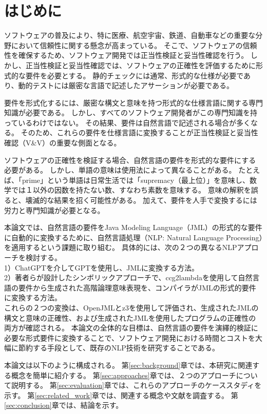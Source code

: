 \documentclass[uplatex, twocolumn,10pt]{jsarticle} %
\begin{document}
\section{はじめに} %
ソフトウェアの普及により、特に医療、航空宇宙、鉄道、自動車などの重要な分野において信頼性に関する懸念が高まっている。
そこで、ソフトウェアの信頼性を確保するため、ソフトウェア開発では正当性検証と妥当性確認を行う。
しかし、正当性検証と妥当性確認では、ソフトウェアの正確性を評価するために形式的な要件を必要とする。
静的チェックには通常、形式的な仕様が必要であり、動的テストには厳密な言語で記述したアサーションが必要である。

要件を形式化するには、厳密な構文と意味を持つ形式的な仕様言語に関する専門知識が必要である。
しかし、すべてのソフトウェア開発者がこの専門知識を持っているわけではない。
その結果、要件は自然言語で記述される場合が多くなる。
そのため、これらの要件を仕様言語に変換することが正当性検証と妥当性確認（V\&V）の重要な側面となる。

ソフトウェアの正確性を検証する場合、自然言語の要件を形式的な要件にする必要がある。
しかし、単語の意味は使用法によって異なることがある。
たとえば、「prime」という単語は日常生活では「supremacy（最上位）」を意味し、数学では１以外の因数を持たない数、すなわち素数を意味する。
意味の解釈を誤ると、壊滅的な結果を招く可能性がある。
加えて、要件を人手で変換するには労力と専門知識が必要となる。

本論文では、自然言語の要件をJava Modeling Language（JML）\cite{1}の形式的な要件に自動的に変換するために、自然言語処理（NLP: Natural Language Processing）を適用するという課題に取り組む。
具体的には、次の２つの異なるNLPアプローチを検討する。\\
1）ChatGPTを介してGPT\cite{2}を使用し、JMLに変換する方法。\\
2）著者らが設計したシンボリックアプローチで、ccg2lambda\cite{3}を使用して自然言語の要件から生成された高階論理意味表現を、コンパイラがJMLの形式的要件に変換する方法。\\
これらの２つの変換は、OpenJML\cite{4}とz3\cite{5}を使用して評価され、生成されたJMLの構文と意味の正確性、および生成されたJMLを使用したプログラムの正確性の両方が確認される。
本論文の全体的な目標は、自然言語の要件を演繹的検証に必要な形式要件に変換することで、ソフトウェア開発における時間とコストを大幅に節約する手段として、既存のNLP技術を研究することである。

本論文は以下のように構成される。
第\ref{sec:background}章では、本研究に関連する概念を簡単に紹介する。
第\ref{sec:approaches}章では、２つのアプローチについて説明する。
第\ref{sec:evaluation}章では、これらのアプローチのケーススタディを示す。
第\ref{sec:related_work}章では、関連する概念や文献を調査する。
第\ref{sec:conclusion}章では、結論を示す。
\end{document}
